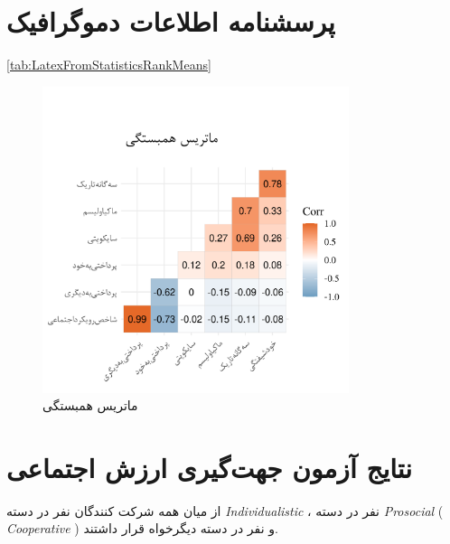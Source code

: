 

\section{پرسشنامه اطلاعات دموگرافیک}

\eqref{tab:LatexFromStatisticsRankMeans}

\LatexFromStatisticsRankMeansCommand
% 
\begin{figure}[htpb]
    \centering
    \includegraphics[width=0.8\textwidth]{./img/CorrPlotIntervals.png}
    \caption{ماتریس همبستگی}
    \label{fig:CorrPlotIntervals}
\end{figure}

\section{نتایج آزمون جهت‌گیری ارزش اجتماعی}
از میان همه شرکت کنندگان
\noOfIndividualisticParticipants
نفر در دسته
\textit{
    \gls{Individualistic}
}
،
\noOfCooperativeParticipants
نفر در دسته
\textit{
    \gls{Prosocial}
}(\textit{
    \gls{Cooperative}
})
و
\noOfAltruisticParticipants
نفر در دسته
دیگر‌خواه
قرار داشتند.

